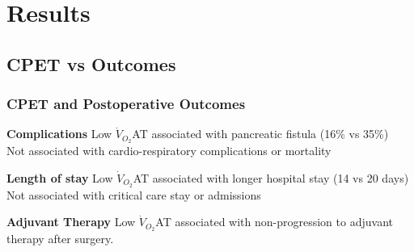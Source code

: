 \documentclass{beamer}
\begin{document}
\section{Results}
\subsection{CPET vs Outcomes}
\begin{frame}
	\frametitle{CPET and Postoperative Outcomes}
	\begin{block}{\textbf{Complications}}
		Low $\dot{V}_{O_2}$AT associated with pancreatic fistula (16\% vs 35\%) \\
		Not associated with cardio-respiratory complications or mortality
	\end{block}
	
	\begin{block}{\textbf{Length of stay}}
		Low $\dot{V}_{O_2}$AT associated with longer hospital stay (14 vs 20 days)\\
		Not associated with critical care stay or admissions
	\end{block}
	
	\begin{block}{\textbf{Adjuvant Therapy}}
		Low $\dot{V}_{O_2}$AT associated with non-progression to adjuvant therapy after surgery.
	\end{block}
	
\end{frame}
\end{document}
